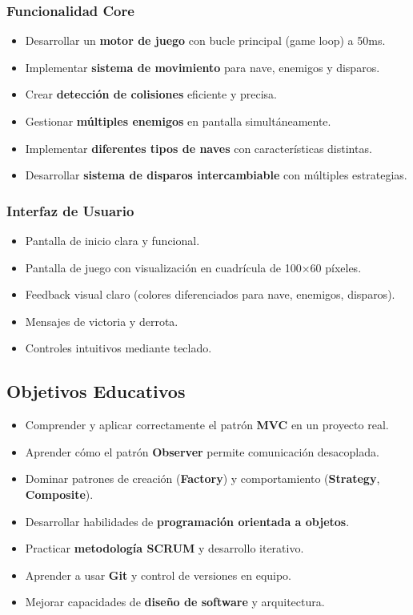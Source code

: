 \documentclass[12pt, a4paper]{article}
\begin{document}
\subsubsection{Funcionalidad Core}

\begin{itemize}[leftmargin=2em]
    \item Desarrollar un \textbf{motor de juego} con bucle principal (game loop) a 50ms.
    \item Implementar \textbf{sistema de movimiento} para nave, enemigos y disparos.
    \item Crear \textbf{detección de colisiones} eficiente y precisa.
    \item Gestionar \textbf{múltiples enemigos} en pantalla simultáneamente.
    \item Implementar \textbf{diferentes tipos de naves} con características distintas.
    \item Desarrollar \textbf{sistema de disparos intercambiable} con múltiples estrategias.
\end{itemize}

\subsubsection{Interfaz de Usuario}

\begin{itemize}[leftmargin=2em]
    \item Pantalla de inicio clara y funcional.
    \item Pantalla de juego con visualización en cuadrícula de 100×60 píxeles.
    \item Feedback visual claro (colores diferenciados para nave, enemigos, disparos).
    \item Mensajes de victoria y derrota.
    \item Controles intuitivos mediante teclado.
\end{itemize}

\subsection{Objetivos Educativos}

\begin{itemize}[leftmargin=2em]
    \item Comprender y aplicar correctamente el patrón \textbf{MVC} en un proyecto real.
    \item Aprender cómo el patrón \textbf{Observer} permite comunicación desacoplada.
    \item Dominar patrones de creación (\textbf{Factory}) y comportamiento (\textbf{Strategy}, \textbf{Composite}).
    \item Desarrollar habilidades de \textbf{programación orientada a objetos}.
    \item Practicar \textbf{metodología SCRUM} y desarrollo iterativo.
    \item Aprender a usar \textbf{Git} y control de versiones en equipo.
    \item Mejorar capacidades de \textbf{diseño de software} y arquitectura.
\end{itemize}
\end{document}
